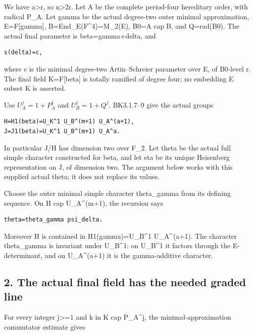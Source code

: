 We have a\textgreater r, so n\textgreater2r. Let A be the complete
period-four hereditary order, with radical P\_A. Let gamma be the actual
degree-two outer minimal approximation, E=F{[}gamma{]},
B=End\_E(F\^{}4)=M\_2(E), B0=A cap B, and Q=rad(B0). The actual final
parameter is beta=gamma+delta, and

\begin{Verbatim}[fontsize=\small,breaklines=true,breakanywhere=true]
s(delta)=c,
\end{Verbatim}

where c is the minimal degree-two Artin--Schreier parameter over E, of
B0-level r. The final field K=F{[}beta{]} is totally ramified of degree
four; no embedding E subset K is asserted.

Use \(U_A^j=1+P_A^j\) and \(U_B^j=1+Q^j\).
BK3.1.7--9 give the actual groups

\begin{Verbatim}[fontsize=\small,breaklines=true,breakanywhere=true]
H=H1(beta)=U_K^1 U_B^(m+1) U_A^(a+1),
J=J1(beta)=U_K^1 U_B^(m+1) U_A^a.
\end{Verbatim}

In particular J/H has dimension two over F\_2. Let theta be the actual
full simple character constructed for beta, and let eta be its unique
Heisenberg representation on J, of dimension two. The argument below
works with this supplied actual theta; it does not replace its values.

Choose the outer minimal simple character theta\_gamma from its defining
sequence. On H cap U\_A\^{}(m+1), the recursion says

\begin{Verbatim}[fontsize=\small,breaklines=true,breakanywhere=true]
theta=theta_gamma psi_delta.
\end{Verbatim}

Moreover H is contained in H1(gamma)=U\_B\^{}1 U\_A\^{}(a+1). The
character theta\_gamma is invariant under U\_B\^{}1: on U\_B\^{}1 it
factors through the E-determinant, and on U\_A\^{}(a+1) it is the
gamma-additive character.

\hypertarget{rank~4-the-actual-final-field-has-the-needed-graded-line}{%
\subsection{2. The actual final field has the needed graded
line}\label{rank~4-the-actual-final-field-has-the-needed-graded-line}}

For every integer j\textgreater=1 and k in K cap P\_A\^{}j, the
minimal-approximation commutator estimate gives

